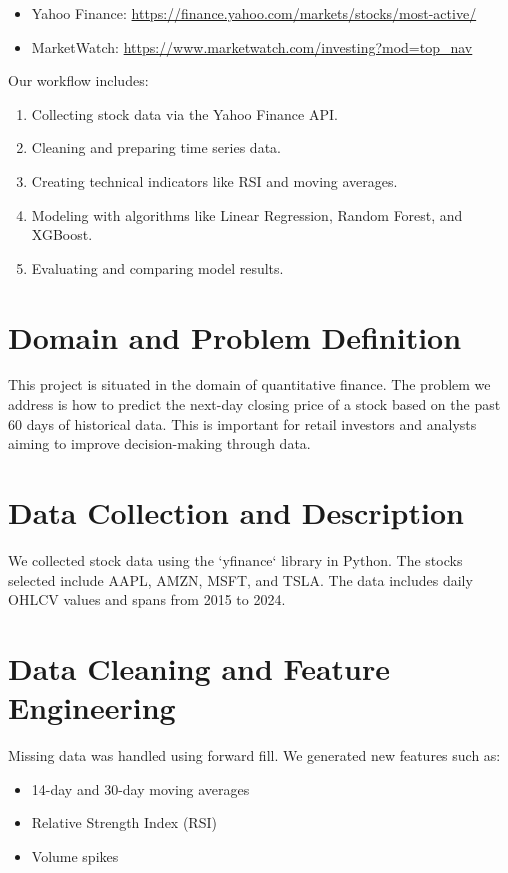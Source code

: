 \documentclass[runningheads]{llncs}
\begin{document}
\begin{itemize}
    \item Yahoo Finance: \url{https://finance.yahoo.com/markets/stocks/most-active/}
    \item MarketWatch: \url{https://www.marketwatch.com/investing?mod=top_nav}
\end{itemize}

Our workflow includes:
\begin{enumerate}
    \item Collecting stock data via the Yahoo Finance API.
    \item Cleaning and preparing time series data.
    \item Creating technical indicators like RSI and moving averages.
    \item Modeling with algorithms like Linear Regression, Random Forest, and XGBoost.
    \item Evaluating and comparing model results.
\end{enumerate}

\section{Domain and Problem Definition}
This project is situated in the domain of quantitative finance. The problem we address is how to predict the next-day closing price of a stock based on the past 60 days of historical data. This is important for retail investors and analysts aiming to improve decision-making through data.

\section{Data Collection and Description}
We collected stock data using the `yfinance` library in Python. The stocks selected include AAPL, AMZN, MSFT, and TSLA. The data includes daily OHLCV values and spans from 2015 to 2024.

\section{Data Cleaning and Feature Engineering}
Missing data was handled using forward fill. We generated new features such as:
\begin{itemize}
    \item 14-day and 30-day moving averages
    \item Relative Strength Index (RSI)
    \item Volume spikes
\end{itemize}
\end{document}
